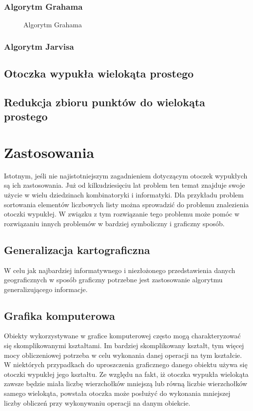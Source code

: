               
        \subsection{Algorytm Grahama}
        \null
        \begin{figure}[h!]
    			
    			\caption{Algorytm Grahama}\label{fig:graham}
    	\end{figure}
       \newpage
        \subsection{Algorytm Jarvisa}
        
        
        \section{Otoczka wypukła wielokąta prostego}
        \section{Redukcja zbioru punktów do wielokąta prostego}
    \chapter{Zastosowania} 
    Istotnym, jeśli nie najistotniejszym zagadnieniem dotyczącym otoczek wypukłych są ich zastosowania. Już od kilkudziesięciu lat problem ten temat znajduje swoje użycie w wielu dziedzinach kombinatoryki i informatyki. Dla przykładu problem sortowania elementów liczbowych listy można sprowadzić do problemu znalezienia otoczki wypukłej. W związku z tym rozwiązanie tego problemu może pomóc w rozwiązaniu innych problemów w bardziej symboliczny i graficzny sposób.
        \section{Generalizacja kartograficzna}
        W celu jak najbardziej informatywnego i niezłożonego przedstawienia danych geograficznych w sposób graficzny potrzebne jest zastosowanie algorytmu generalizującego informacje.
		\section{Grafika komputerowa}
		Obiekty wykorzystywane w grafice komputerowej często mogą charakteryzować się skomplikowanymi kształtami. Im bardziej skomplikowany kształt, tym więcej mocy obliczeniowej potrzeba w celu wykonania danej operacji na tym kształcie. W niektórych przypadkach do uproszczenia graficznego danego obiektu używa się otoczki wypukłej jego kształtu. Ze względu na fakt, iż otoczka wypukła wielokąta zawsze będzie miała liczbę wierzchołków mniejszą lub równą liczbie wierzchołków samego wielokąta, powstała otoczka może posłużyć do wykonania mniejszej liczby obliczeń przy wykonywaniu operacji na danym obiekcie.
